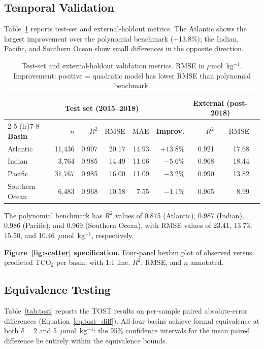 \documentclass[12pt,a4paper]{article}
\begin{document}
\subsection{Temporal Validation}

Table~\ref{tab:validation} reports test-set and external-holdout metrics. The Atlantic shows the largest improvement over the polynomial benchmark (+13.8\%); the Indian, Pacific, and Southern Ocean show small differences in the opposite direction.

\begin{table}[htbp]
\centering
\caption{Test-set and external-holdout validation metrics. RMSE in $\mu$mol~kg$^{-1}$. Improvement: positive = quadratic model has lower RMSE than polynomial benchmark.}
\label{tab:validation}
\begin{tabular}{l rrrr r rrr}
\toprule
 & \multicolumn{4}{c}{\textbf{Test set (2015--2018)}} & & \multicolumn{2}{c}{\textbf{External (post-2018)}} \\
\cmidrule(lr){2-5} \cmidrule(lr){7-8}
\textbf{Basin} & $n$ & $R^2$ & RMSE & MAE & \textbf{Improv.} & $R^2$ & RMSE \\
\midrule
Atlantic        & 11{,}436 & 0.907 & 20.17 & 14.93 & $+13.8\%$ & 0.921 & 17.68 \\
Indian          &  3{,}764 & 0.985 & 14.49 & 11.06 & $-5.6\%$  & 0.968 & 18.44 \\
Pacific         & 31{,}767 & 0.985 & 16.00 & 11.09 & $-3.2\%$  & 0.990 & 13.82 \\
Southern Ocean  &  6{,}483 & 0.968 & 10.58 &  7.55 & $-1.1\%$  & 0.965 &  8.99 \\
\bottomrule
\end{tabular}
\end{table}

The polynomial benchmark has $R^2$ values of 0.875 (Atlantic), 0.987 (Indian), 0.986 (Pacific), and 0.969 (Southern Ocean), with RMSE values of 23.41, 13.73, 15.50, and 10.46~$\mu$mol~kg$^{-1}$, respectively.

\textbf{Figure~\ref{fig:scatter} specification.} Four-panel hexbin plot of observed versus predicted TCO$_2$ per basin, with 1:1 line, $R^2$, RMSE, and $n$ annotated.

\subsection{Equivalence Testing}

Table~\ref{tab:tost} reports the TOST results on per-sample paired absolute-error differences (Equation~\ref{eq:tost_diff}). All four basins achieve formal equivalence at both $\delta = 2$ and 5~$\mu$mol~kg$^{-1}$: the 95\% confidence intervals for the mean paired difference lie entirely within the equivalence bounds.
\end{document}
